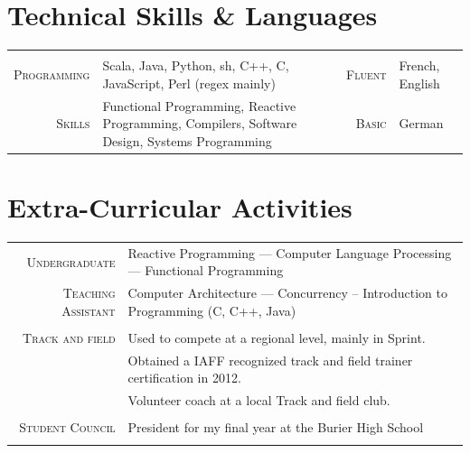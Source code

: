 \documentclass[a4paper,11pt]{article} %
\begin{document}
\section{Technical Skills \& Languages}
\begin{center}

\vspace{-0.3cm}
\begin{tabularx}{\textwidth}{rX|rl}

& & & \\
\textsc{\large{Programming}} & Scala, Java, Python, sh, C++, C, JavaScript, Perl (regex mainly) &
\textsc{\large{Fluent}} & French, English \\
\textsc{\large{Skills}} & Functional Programming, Reactive Programming, Compilers, Software Design, Systems Programming &
\textsc{\large{Basic}} & German \\

\end{tabularx}

\end{center}


\section{Extra-Curricular Activities}
\begin{tabular}{rl}
\textsc{\large{Undergraduate}} &
Reactive Programming ---
Computer Language Processing --- Functional Programming \\
\textsc{\large{Teaching Assistant}} &
Computer Architecture --- Concurrency -- Introduction to Programming (C, C++, Java) \\
\multicolumn{2}{c}{} \\

\textsc{\large{Track and field}} &
Used to compete at a regional level, mainly in Sprint.\\
& Obtained a IAFF recognized track and field trainer certification in 2012. \\
& Volunteer coach at a local Track and field club.\\
\multicolumn{2}{c}{} \\

\textsc{\large{Student Council}} &
President for my final year at the Burier High School \\
\multicolumn{2}{c}{} \\

\end{tabular}
\end{document}
